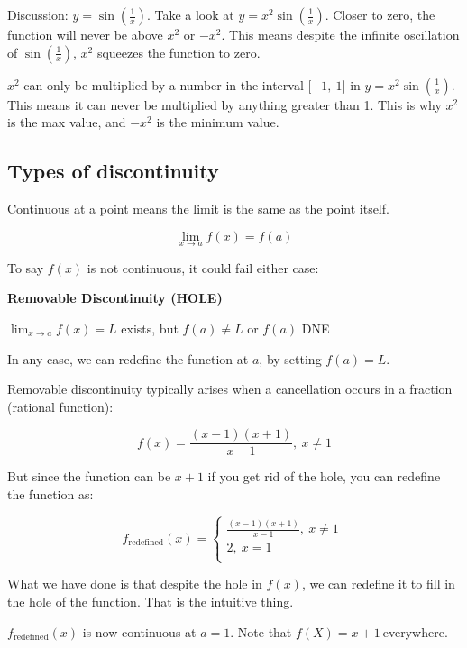 \documentclass[12pt]{article}
\theoremstyle{plain}
\theoremstyle{remark}
\theoremstyle{definition}
\begin{document}
Discussion: \(y = \sin\left( \frac{1}{x} \right)\). Take a look at
\(y = x^{2}\sin\left( \frac{1}{x} \right)\). Closer to zero, the
function will never be above \(x^{2}\) or \(- x^{2}\). This means
despite the infinite oscillation of \(\sin\left( \frac{1}{x} \right)\),
\(x^{2}\) squeezes the function to zero.

\(x^{2}\) can only be multiplied by a number in the interval
\(\lbrack - 1,\ 1\rbrack\) in
\(y = x^{2}\sin\left( \frac{1}{x} \right)\). This means it can never be
multiplied by anything greater than 1. This is why \(x^{2}\) is the max
value, and \(- x^{2}\) is the minimum value.



\subsection{Types of discontinuity}

Continuous at a point means the limit is the same as the point itself.

\[\lim_{x \rightarrow a}{f(x) = f(a)}\]

To say \(f(x)\) is not continuous, it could fail either case:

\textbf{Removable Discontinuity (HOLE)}

\(\lim_{x \rightarrow a}{f(x) = L}\) exists, but \(f(a) \neq L\) or
\(f(a)\) DNE

In any case, we can redefine the function at \(a\), by setting
\(f(a) = L\).

Removable discontinuity typically arises when a cancellation occurs in a
fraction (rational function):

\[f(x) = \frac{(x - 1)(x + 1)}{x - 1},\ x \neq 1\]

But since the function can be \(x + 1\) if you get rid of the hole, you
can redefine the function as:

\[f_{\text{redefined}}(x) = \left\{ \begin{matrix}
\frac{(x - 1)(x + 1)}{x - 1},\ x \neq 1 \\
2,\ x = 1 \\
\end{matrix} \right.\ \]

What we have done is that despite the hole in \(f(x)\), we can redefine
it to fill in the hole of the function. That is the intuitive thing.

\(f_{\text{redefined}}(x)\) is now continuous at \(a = 1\). Note that
\(f(X) = x + 1\ \)everywhere.
\end{document}
